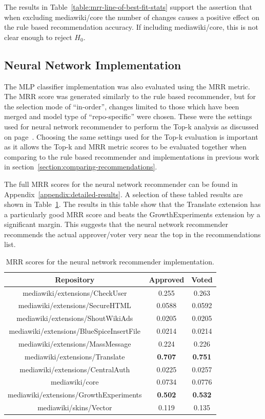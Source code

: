 The results in Table~\ref{table:mrr-line-of-best-fit-stats} support the assertion that when excluding mediawiki/core the number of changes causes a positive effect on the rule based recommendation accuracy. If including mediawiki/core, this is not clear enough to reject \(H_0\).

\subsection{Neural Network Implementation}

The MLP classifier implementation was also evaluated using the MRR metric. The MRR score was generated similarly to the rule based recommender, but for the selection mode of ``in-order'', changes limited to those which have been merged and model type of ``repo-specific'' were chosen. These were the settings used for neural network recommender to perform the Top-k analysis as discussed on page~\pageref{para:use-in-order-for-neural-network}. Choosing the same settings used for the Top-k evaluation is important as it allows the Top-k and MRR metric scores to be evaluated together when comparing to the rule based recommender and implementations in previous work in section~\ref{section:comparing-recommendations}.

The full MRR scores for the neural network recommender can be found in Appendix~\ref{appendix:detailed-results}. A selection of these tabled results are shown in Table~\ref{table:neural-network-mrr-scores}. The results in this table show that the Translate extension has a particularly good MRR score and beats the GrowthExperiments extension by a significant margin. This suggests that the neural network recommender recommends the actual approver/voter very near the top in the recommendations list.

\begin{table}[H]
    \centering
    \begin{tabular}{@{}c c c@{}} 
 \hline
    \textbf{Repository} & \textbf{Approved} & \textbf{Voted} \\
\hline
mediawiki/extensions/CheckUser & 0.255 & 0.263 \\
mediawiki/extensions/SecureHTML & 0.0588 & 0.0592 \\
mediawiki/extensions/ShoutWikiAds & 0.0205 & 0.0205 \\
mediawiki/extensions/BlueSpiceInsertFile & 0.0214 & 0.0214 \\
mediawiki/extensions/MassMessage & 0.224 & 0.226 \\
mediawiki/extensions/Translate & \textbf{0.707} & \textbf{0.751} \\
mediawiki/extensions/CentralAuth & 0.0225 & 0.0257 \\
mediawiki/core & 0.0734 & 0.0776 \\
mediawiki/extensions/GrowthExperiments & \textbf{0.502} & \textbf{0.532} \\
mediawiki/skins/Vector & 0.119 & 0.135 \\
\hline
\end{tabular}
    \caption{MRR scores for the neural network recommender implementation.}
    \label{table:neural-network-mrr-scores}
\end{table}

